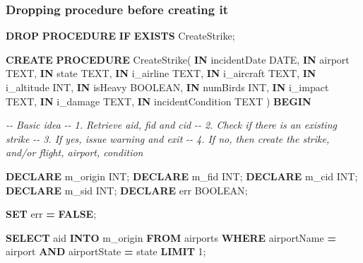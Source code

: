 \documentclass[
]{article}
\newenvironment{Shaded}{\begin{snugshade}}{\end{snugshade}}
\newcommand{\CommentTok}[1]{\textcolor[rgb]{0.56,0.35,0.01}{\textit{#1}}}
\newcommand{\ControlFlowTok}[1]{\textcolor[rgb]{0.13,0.29,0.53}{\textbf{#1}}}
\newcommand{\DataTypeTok}[1]{\textcolor[rgb]{0.13,0.29,0.53}{#1}}
\newcommand{\DecValTok}[1]{\textcolor[rgb]{0.00,0.00,0.81}{#1}}
\newcommand{\KeywordTok}[1]{\textcolor[rgb]{0.13,0.29,0.53}{\textbf{#1}}}
\newcommand{\NormalTok}[1]{#1}
\newcommand{\OperatorTok}[1]{\textcolor[rgb]{0.81,0.36,0.00}{\textbf{#1}}}
\begin{document}
\hypertarget{dropping-procedure-before-creating-it}{%
\subsubsection{Dropping procedure before creating
it}\label{dropping-procedure-before-creating-it}}

\begin{Shaded}
\begin{Highlighting}[]
\KeywordTok{DROP} \KeywordTok{PROCEDURE} \ControlFlowTok{IF} \KeywordTok{EXISTS}\NormalTok{ CreateStrike;}
\end{Highlighting}
\end{Shaded}

\begin{Shaded}
\begin{Highlighting}[]
\KeywordTok{CREATE} \KeywordTok{PROCEDURE}\NormalTok{ CreateStrike(}
    \KeywordTok{IN}\NormalTok{ incidentDate }\DataTypeTok{DATE}\NormalTok{,}
    \KeywordTok{IN}\NormalTok{ airport TEXT,}
    \KeywordTok{IN}\NormalTok{ state TEXT,}
    \KeywordTok{IN}\NormalTok{ i\_airline TEXT,}
    \KeywordTok{IN}\NormalTok{ i\_aircraft TEXT,}
    \KeywordTok{IN}\NormalTok{ i\_altitude }\DataTypeTok{INT}\NormalTok{,}
    \KeywordTok{IN}\NormalTok{ isHeavy }\DataTypeTok{BOOLEAN}\NormalTok{,}
    \KeywordTok{IN}\NormalTok{ numBirds }\DataTypeTok{INT}\NormalTok{,}
    \KeywordTok{IN}\NormalTok{ i\_impact TEXT,}
    \KeywordTok{IN}\NormalTok{ i\_damage TEXT,}
    \KeywordTok{IN}\NormalTok{ incidentCondition TEXT}
\NormalTok{)}
\ControlFlowTok{BEGIN}

\CommentTok{{-}{-} Basic idea}
\CommentTok{{-}{-} 1. Retrieve aid, fid and cid}
\CommentTok{{-}{-} 2. Check if there is an existing strike}
\CommentTok{{-}{-} 3. If yes, issue warning and exit}
\CommentTok{{-}{-} 4. If no, then create the strike, and/or flight, airport, condition}

    \KeywordTok{DECLARE}\NormalTok{ m\_origin }\DataTypeTok{INT}\NormalTok{;}
    \KeywordTok{DECLARE}\NormalTok{ m\_fid }\DataTypeTok{INT}\NormalTok{;}
    \KeywordTok{DECLARE}\NormalTok{ m\_cid }\DataTypeTok{INT}\NormalTok{;}
    \KeywordTok{DECLARE}\NormalTok{ m\_sid }\DataTypeTok{INT}\NormalTok{;}
    \KeywordTok{DECLARE}\NormalTok{ err }\DataTypeTok{BOOLEAN}\NormalTok{;}
    
    \KeywordTok{SET}\NormalTok{ err }\OperatorTok{=} \KeywordTok{FALSE}\NormalTok{;}
    
    \KeywordTok{SELECT}\NormalTok{ aid }\KeywordTok{INTO}\NormalTok{ m\_origin }
    \KeywordTok{FROM}\NormalTok{ airports }
    \KeywordTok{WHERE}\NormalTok{ airportName }\OperatorTok{=}\NormalTok{ airport }\KeywordTok{AND}\NormalTok{ airportState }\OperatorTok{=}\NormalTok{ state}
    \KeywordTok{LIMIT} \DecValTok{1}\NormalTok{;}
    

\end{Highlighting}
\end{Shaded}
\end{document}
